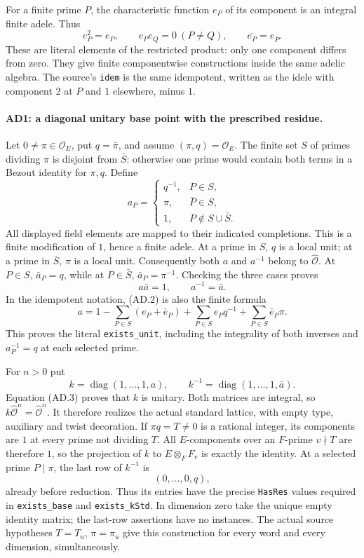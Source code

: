 \documentclass[11pt,a4paper]{article}
\numberwithin{equation}{section}
\theoremstyle{remark}\newtheorem{remark}[theorem]{Remark}
\begin{document}
For a finite prime $P$, the characteristic function $e_P$ of its
component is an integral finite adele. Thus
\[
 e_P^2=e_P,\qquad e_Pe_Q=0\ (P\ne Q),\qquad
 \overline{e_P}=e_{\bar P}.                         \tag{AD.1}
\]
These are literal elements of the restricted product: only one
component differs from zero. They give finite componentwise
constructions inside the same adelic algebra. The source's
\texttt{idem} is the same idempotent, written as the idele with
component $2$ at $P$ and $1$ elsewhere, minus $1$.

\paragraph{AD1: a diagonal unitary base point with the prescribed residue.}
Let $0\ne\pi\in\mathcal O_E$, put $q=\bar\pi$, and assume
$(\pi,q)=\mathcal O_E$. The finite set $S$ of primes dividing
$\pi$ is disjoint from $\bar S$: otherwise one prime would
contain both terms in a Bezout identity for $\pi,q$.
Define
\[
 a_P=
 \begin{cases}
 q^{-1},&P\in S,\\
 \pi,&\bar P\in S,\\
 1,&P\notin S\cup\bar S.
 \end{cases}                                         \tag{AD.2}
\]
All displayed field elements are mapped to their indicated
completions. This is a finite modification of $1$, hence a finite
adele. At a prime in $S$, $q$ is a local unit; at a prime in
$\bar S$, $\pi$ is a local unit. Consequently both $a$ and
$a^{-1}$ belong to $\widehat{\mathcal O}$. At $P\in S$,
$\bar a_P=q$, while at $P\in\bar S$, $\bar a_P=\pi^{-1}$.
Checking the three cases proves
\[
                 a\bar a=1,\qquad a^{-1}=\bar a.      \tag{AD.3}
\]
In the idempotent notation, (AD.2) is also the finite formula
\[
 a=1-\sum_{P\in S}(e_P+\bar e_P)
          +\sum_{P\in S}e_Pq^{-1}
          +\sum_{P\in S}\bar e_P\pi.
\]
This proves the literal \texttt{exists\_\allowbreak unit}, including the
integrality of both inverses and $a_P^{-1}=q$ at each selected prime.

For $n>0$ put
\[
 k=\operatorname{diag}(1,\ldots,1,a),\qquad
 k^{-1}=\operatorname{diag}(1,\ldots,1,\bar a).        \tag{AD.4}
\]
Equation (AD.3) proves that $k$ is unitary. Both matrices are
integral, so $k\widehat{\mathcal O}^{n}=
\widehat{\mathcal O}^{n}$. It therefore realizes the actual
standard lattice, with empty type, auxiliary and twist decoration.
If $\pi q=T\ne0$ is a rational integer, its components are $1$
at every prime not dividing $T$. All $E$-components over an
$F$-prime $v\nmid T$ are therefore $1$, so the projection of
$k$ to $E\otimes_FF_v$ is exactly the identity. At a selected
prime $P\mid\pi$, the last row of $k^{-1}$ is
\[
              (0,\ldots,0,q),                       \tag{AD.5}
\]
already before reduction. Thus its entries have the precise
\texttt{HasRes} values required in \texttt{exists\_\allowbreak base} and
\texttt{exists\_\allowbreak kStd}. In dimension zero take the unique empty
identity matrix; the last-row assertions have no instances.
The actual source hypotheses $T=T_u$, $\pi=\pi_u$ give this
construction for every word and every dimension, simultaneously.
\end{document}
